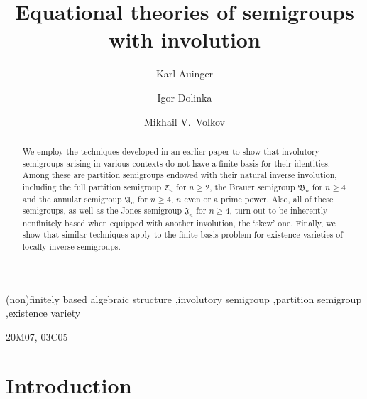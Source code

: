 \documentclass[preprint,1p,times]{elsarticle}
\numberwithin{equation}{section}
\theoremstyle{remark}
\def\A{\mathfrak{A}}
\def\C{\mathfrak{C}}
\def\B{\mathfrak{B}}
\def\J{\mathfrak{J}}
\begin{document}
\begin{frontmatter}

\title{Equational theories of semigroups with involution}

\author[ka]{Karl Auinger}
\author[id]{Igor Dolinka}
\author[mvv]{Mikhail V.\ Volkov}


\address[ka]{Fakult\"at f\"ur Mathematik, Universit\"at Wien, Nordbergstrasse 15,  A-1090 Wien, Austria}
\address[id]{Department of Mathematics and Informatics, University of Novi Sad, Trg Dositeja Obradovi\'ca 4,
21000 Novi Sad, Serbia}
\address[mvv]{Faculty of Mathematics and Mechanics, Ural State University, Lenina 51, 620083 Ekaterinburg, Russia}

\begin{abstract}
{We employ} the techniques developed in an earlier paper to show
that involutory semigroups arising in various contexts do not have a
finite basis for their identities. Among these are partition
semigroups endowed with their natural inverse involution, including
the full partition semigroup $\C_n$ for $n\ge 2$, the Brauer
semigroup $\B_n$ for $n\ge 4$ and the annular semigroup $\A_n$ for
$n\ge 4$, $n$ even or a prime power. Also, all of these semigroups,
as well as the Jones semigroup $\J_n$ for $n\ge 4$, turn out to be
inherently nonfinitely based when equipped with another involution,
the `skew' one. Finally, we show that similar techniques apply to
the finite basis problem for existence varieties of locally inverse
semigroups.
\end{abstract}

\begin{keyword}
{(non)finitely based algebraic structure} \sep involutory semigroup \sep partition semigroup \sep existence variety

\MSC[2010] 20M07, 03C05
\end{keyword}

\end{frontmatter}

\section*{Introduction}
\end{document}
